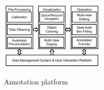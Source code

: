 \documentclass[letterpaper, 10 pt, conference]{ieeeconf}  %
\begin{document}
\begin{figure}[tp]
	\centering
	\includegraphics[width=0.45\textwidth]{./platform}\\ %
	\caption{Annotation platform}
	\label{fig:main-arch}
	\vspace{-0.3cm}
\end{figure}
\end{document}
